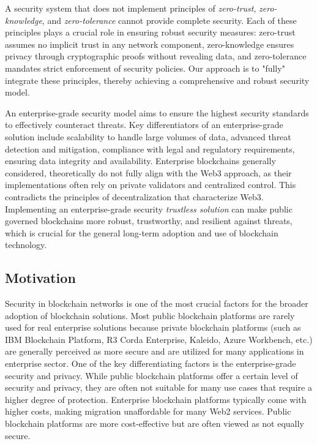 A security system that does not implement principles of \textit{zero-trust}, \textit{zero-knowledge}, and \textit{zero-tolerance} cannot provide complete security. Each of these principles plays a crucial role in ensuring robust security measures: zero-trust assumes no implicit trust in any network component, zero-knowledge ensures privacy through cryptographic proofs without revealing data, and zero-tolerance mandates strict enforcement of security policies. Our approach is to "fully" integrate these principles, thereby achieving a comprehensive and robust security model. \cite{nist_pub_zero_trust_arch}

An enterprise-grade security model aims to ensure the highest security standards to effectively counteract threats. Key differentiators of an enterprise-grade solution include scalability to handle large volumes of data, advanced threat detection and mitigation, compliance with legal and regulatory requirements, ensuring data integrity and availability. Enterprise blockchains generally considered, theoretically do not fully align with the Web3 approach, as their implementations often rely on private validators and centralized control. This contradicts the principles of decentralization that characterize Web3. Implementing an enterprise-grade security \textit{trustless solution} can make public governed blockchains more robust, trustworthy, and resilient against threats, which is crucial for the general long-term adoption and use of blockchain technology.

\subsection{Motivation}
Security in blockchain networks is one of the most crucial factors for the broader adoption of blockchain solutions. Most public blockchain platforms are rarely used for real enterprise solutions because private blockchain platforms (such as IBM Blockchain Platform, R3 Corda Enterprise, Kaleido, Azure Workbench, etc.) are generally perceived as more secure and are utilized for many applications in enterprise sector. One of the key differentiating factors is the enterprise-grade security and privacy. While public blockchain platforms offer a certain level of security and privacy, they are often not suitable for many use cases that require a higher degree of protection. Enterprise blockchain platforms typically come with higher costs, making migration unaffordable for many Web2 services. Public blockchain platforms are more cost-effective but are often viewed as not equally secure.

